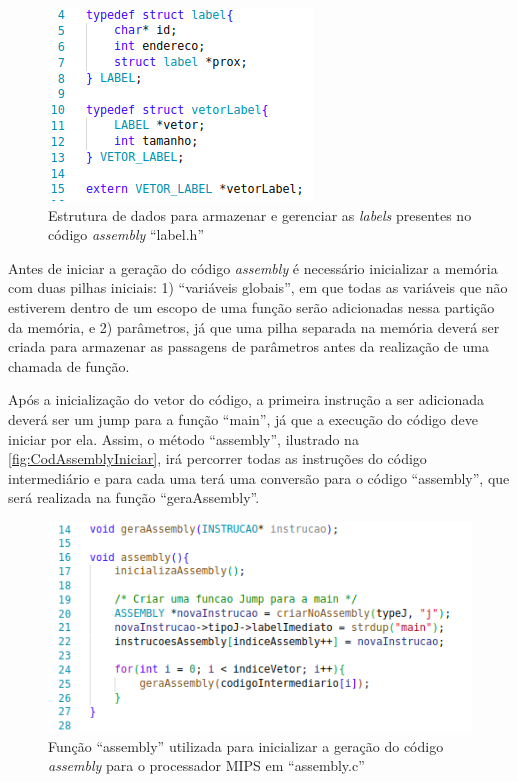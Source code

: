 \documentclass[
	12pt,				%
	oneside,
	a4paper,			%
	english,			%
	french,				%
	spanish,			%
	brazil,				%
	]{abntex2}
\begin{document}
\begin{figure}[tbhp]
\centering 
\caption{Estrutura de dados para armazenar e gerenciar as \emph{labels} presentes no código \emph{assembly} \nohyphens{``label.h''}} 
\label{fig:StructsLabels}
\graphicspath{ {./imgs/} } 
\includegraphics[scale=0.6]{imgs/Codigo/Struct_Labels.png}
\end{figure}

Antes de iniciar a geração do código \emph{assembly} é necessário inicializar a memória com duas pilhas iniciais: 1) ``variáveis globais'', em que todas as variáveis que não estiverem dentro de um escopo de uma função serão adicionadas nessa partição da memória, e 2) parâmetros, já que uma pilha separada na memória deverá ser criada para armazenar as passagens de parâmetros antes da realização de uma chamada de função. 

Após a inicialização do vetor do código, a primeira instrução a ser adicionada deverá ser um jump para a função ``main'', já que a execução do código deve iniciar por ela. Assim, o método ``assembly'', ilustrado na \autoref{fig:CodAssemblyIniciar}, irá percorrer todas as instruções do código intermediário e para cada uma terá uma conversão para o código ``assembly'', que será realizada na função ``geraAssembly''.

\begin{figure}[tbhp]
\centering 
\caption{Função ``assembly'' utilizada para inicializar a geração do código \emph{assembly} para o processador MIPS em \nohyphens{``assembly.c''}} 
\label{fig:CodAssemblyIniciar}
\graphicspath{ {./imgs/} } 
\includegraphics[scale=0.6]{imgs/Codigo/Cod_Assembly.png}
\end{figure}
\end{document}
